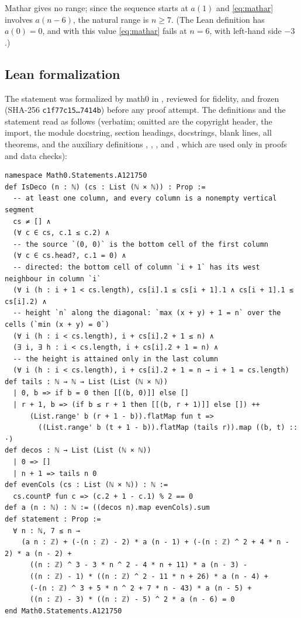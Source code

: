 \documentclass[11pt]{amsart}
\theoremstyle{plain}
\theoremstyle{definition}
\begin{document}
Mathar gives no range; since the sequence starts at $a(1)$ and \eqref{eq:mathar} involves $a(n-6)$, the natural range is $n\ge7$. (The Lean definition has $a(0)=0$, and with this value \eqref{eq:mathar} fails at $n=6$, with left-hand side $-3$.)

\subsection*{Lean formalization}
The statement was formalized by math0 in , reviewed for fidelity, and frozen (SHA-256 \texttt{c1f77c15\ldots 7414b}) before any proof attempt. The definitions and the statement read as follows (verbatim; omitted are the copyright header, the import, the module docstring, section headings, docstrings, blank lines, all theorems, and the auxiliary definitions , , ,  and , which are used only in proofs and data checks):
\begin{lstlisting}
namespace Math0.Statements.A121750
def IsDeco (n : ℕ) (cs : List (ℕ × ℕ)) : Prop :=
  -- at least one column, and every column is a nonempty vertical segment
  cs ≠ [] ∧
  (∀ c ∈ cs, c.1 ≤ c.2) ∧
  -- the source `(0, 0)` is the bottom cell of the first column
  (∀ c ∈ cs.head?, c.1 = 0) ∧
  -- directed: the bottom cell of column `i + 1` has its west neighbour in column `i`
  (∀ i (h : i + 1 < cs.length), cs[i].1 ≤ cs[i + 1].1 ∧ cs[i + 1].1 ≤ cs[i].2) ∧
  -- height `n` along the diagonal: `max (x + y) + 1 = n` over the cells (`min (x + y) = 0`)
  (∀ i (h : i < cs.length), i + cs[i].2 + 1 ≤ n) ∧
  (∃ i, ∃ h : i < cs.length, i + cs[i].2 + 1 = n) ∧
  -- the height is attained only in the last column
  (∀ i (h : i < cs.length), i + cs[i].2 + 1 = n → i + 1 = cs.length)
def tails : ℕ → ℕ → List (List (ℕ × ℕ))
  | 0, b => if b = 0 then [[(b, 0)]] else []
  | r + 1, b => (if b ≤ r + 1 then [[(b, r + 1)]] else []) ++
      (List.range' b (r + 1 - b)).flatMap fun t =>
        ((List.range' b (t + 1 - b)).flatMap (tails r)).map ((b, t) :: ·)
def decos : ℕ → List (List (ℕ × ℕ))
  | 0 => []
  | n + 1 => tails n 0
def evenCols (cs : List (ℕ × ℕ)) : ℕ :=
  cs.countP fun c => (c.2 + 1 - c.1) % 2 == 0
def a (n : ℕ) : ℕ := ((decos n).map evenCols).sum
def statement : Prop :=
  ∀ n : ℕ, 7 ≤ n →
    (a n : ℤ) + (-(n : ℤ) - 2) * a (n - 1) + (-(n : ℤ) ^ 2 + 4 * n - 2) * a (n - 2) +
      ((n : ℤ) ^ 3 - 3 * n ^ 2 - 4 * n + 11) * a (n - 3) -
      ((n : ℤ) - 1) * ((n : ℤ) ^ 2 - 11 * n + 26) * a (n - 4) +
      (-(n : ℤ) ^ 3 + 5 * n ^ 2 + 7 * n - 43) * a (n - 5) +
      ((n : ℤ) - 3) * ((n : ℤ) - 5) ^ 2 * a (n - 6) = 0
end Math0.Statements.A121750
\end{lstlisting}
\end{document}
